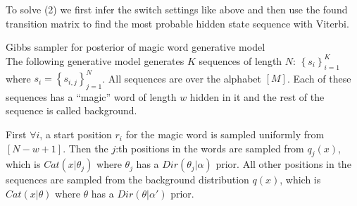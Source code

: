 \documentclass[a4paper,twoside=false,abstract=false,numbers=noenddot,
titlepage=false,headings=small,parskip=half,version=last]{scrartcl}
\begin{document}
\begin{solution}
    To solve (2) we first infer the switch settings like above and then use
    the found transition matrix to find the most probable hidden state sequence
    with Viterbi.




\end{solution}

\begin{exercise}{3}Gibbs sampler for posterior of magic word generative model\\
    The following generative model generates $K$ sequences of length $N$:
    $\left\{s_i\right\}_{i=1}^K$ where $s_i=\left\{s_{i,j}\right\}_{j=1}^N$.
    All sequences are over the alphabet $\left[M\right]$. Each of these
    sequences has a ``magic'' word of length $w$ hidden in it and the rest of
    the sequence is called background.

    First $\forall i$, a start position $r_i$ for the magic word is sampled
    uniformly from $\left[N-w+1\right]$. Then the $j$:th positions in the words
    are sampled from $q_j(x)$, which is $Cat\left(x|\theta_j\right)$ where 
    $\theta_j$ has a $Dir\left(\theta_j|\alpha\right)$ prior. All other
    positions in the sequences are sampled from the background distribution
    $q(x)$, which is $Cat\left(x|\theta\right)$ where $\theta$ has a
    $Dir\left(\theta|\alpha'\right)$ prior.
\end{exercise}
\begin{solution}
    
\end{solution}
\end{document}
